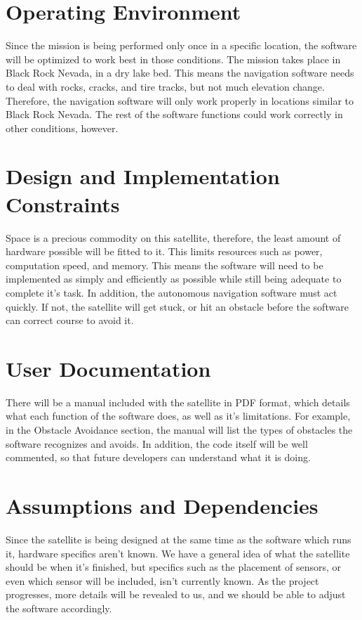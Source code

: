 \documentclass{scrreprt}
\begin{document}
\section{Operating Environment}
Since the mission is being performed only once in a specific location, the software will be optimized to work best in those conditions. The mission takes place in Black Rock Nevada, in a dry lake bed. This means the navigation software needs to deal with rocks, cracks, and tire tracks, but not much elevation change. Therefore, the navigation software will only work properly in locations similar to Black Rock Nevada. The rest of the software functions could work correctly in other conditions, however. 

\section{Design and Implementation Constraints}
Space is a precious commodity on this satellite, therefore, the least amount of hardware possible will be fitted to it. This limits resources such as power, computation speed, and memory. This means the software will need to be implemented as simply and efficiently as possible while still being adequate to complete it's task. In addition, the autonomous navigation software must act quickly. If not, the satellite will get stuck, or hit an obstacle before the software can correct course to avoid it.

\section{User Documentation}
There will be a manual included with the satellite in PDF format, which details what each function of the software does, as well as it's limitations. For example, in the Obstacle Avoidance section, the manual will list the types of obstacles the software recognizes and avoids. In addition, the code itself will be well commented, so that future developers can understand what it is doing.

\section{Assumptions and Dependencies}
Since the satellite is being designed at the same time as the software which runs it, hardware specifics aren't known. We have a general idea of what the satellite should be when it's finished, but specifics such as the placement of sensors, or even which sensor will be included, isn't currently known. As the project progresses, more details will be revealed to us, and we should be able to adjust the software accordingly.
\end{document}
